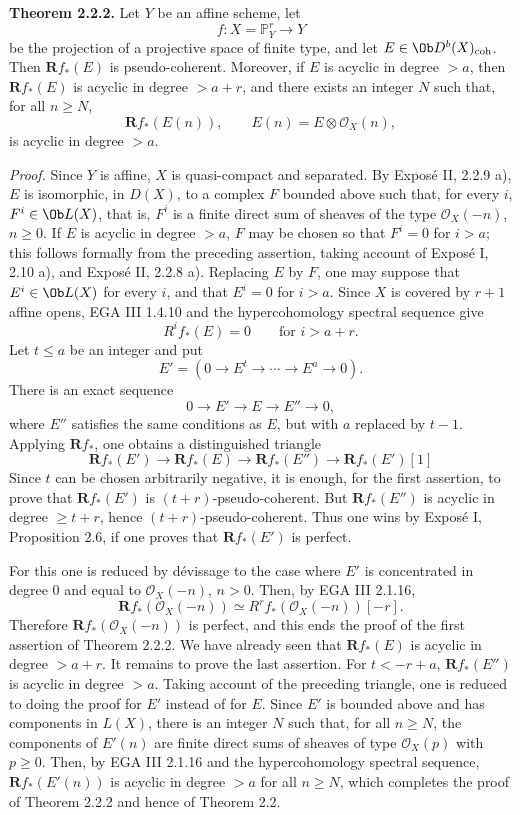 \documentclass[11pt]{article}
\begin{document}
\textbf{Theorem 2.2.2.} Let \(Y\) be an affine scheme, let
\[
  f:X=\mathbb P^r_Y\longrightarrow Y
\]
be the projection of a projective space of finite type, and let \(E\in \Ob D^b(X)_{\mathrm{coh}}\). Then \(\mathbf Rf_*(E)\) is pseudo-coherent. Moreover, if \(E\) is acyclic in degree \(>a\), then \(\mathbf Rf_*(E)\) is acyclic in degree \(>a+r\), and there exists an integer \(N\) such that, for all \(n\geq N\),
\[
  \mathbf Rf_*(E(n)),\qquad E(n)=E\otimes\mathcal O_X(n),
\]
is acyclic in degree \(>a\).

\emph{Proof.} Since \(Y\) is affine, \(X\) is quasi-compact and separated. By Exposé II, 2.2.9 a), \(E\) is isomorphic, in \(D(X)\), to a complex \(F\) bounded above such that, for every \(i\), \(F^i\in \Ob L(X)\), that is, \(F^i\) is a finite direct sum of sheaves of the type \(\mathcal O_X(-n)\), \(n\geq 0\). If \(E\) is acyclic in degree \(>a\), \(F\) may be chosen so that \(F^i=0\) for \(i>a\); this follows formally from the preceding assertion, taking account of Exposé I, 2.10 a), and Exposé II, 2.2.8 a). Replacing \(E\) by \(F\), one may suppose that \(E^i\in \Ob L(X)\) for every \(i\), and that \(E^i=0\) for \(i>a\). Since \(X\) is covered by \(r+1\) affine opens, EGA III 1.4.10 and the hypercohomology spectral sequence give
\[
  R^if_*(E)=0\qquad\text{for }i>a+r.
\]
Let \(t\leq a\) be an integer and put
\[
  E'=(0\to E^t\to\cdots\to E^a\to 0).
\]
There is an exact sequence
\[
  0\longrightarrow E'\longrightarrow E\longrightarrow E''\longrightarrow 0,
\]
where \(E''\) satisfies the same conditions as \(E\), but with \(a\) replaced by \(t-1\). Applying \(\mathbf Rf_*\), one obtains a distinguished triangle
\[
\mathbf Rf_*(E')\longrightarrow \mathbf Rf_*(E)\longrightarrow \mathbf Rf_*(E'')\longrightarrow \mathbf Rf_*(E')[1]
\]
Since \(t\) can be chosen arbitrarily negative, it is enough, for the first assertion, to prove that \(\mathbf Rf_*(E')\) is \((t+r)\)-pseudo-coherent. But \(\mathbf Rf_*(E'')\) is acyclic in degree \(\geq t+r\), hence \((t+r)\)-pseudo-coherent. Thus one wins by Exposé I, Proposition 2.6, if one proves that \(\mathbf Rf_*(E')\) is perfect.

For this one is reduced by dévissage to the case where \(E'\) is concentrated in degree \(0\) and equal to \(\mathcal O_X(-n)\), \(n>0\). Then, by EGA III 2.1.16,
\[
  \mathbf Rf_*(\mathcal O_X(-n))\simeq R^rf_*(\mathcal O_X(-n))[-r].
\]
Therefore \(\mathbf Rf_*(\mathcal O_X(-n))\) is perfect, and this ends the proof of the first assertion of Theorem 2.2.2. We have already seen that \(\mathbf Rf_*(E)\) is acyclic in degree \(>a+r\). It remains to prove the last assertion. For \(t<-r+a\), \(\mathbf Rf_*(E'')\) is acyclic in degree \(>a\). Taking account of the preceding triangle, one is reduced to doing the proof for \(E'\) instead of for \(E\). Since \(E'\) is bounded above and has components in \(L(X)\), there is an integer \(N\) such that, for all \(n\geq N\), the components of \(E'(n)\) are finite direct sums of sheaves of type \(\mathcal O_X(p)\) with \(p\geq 0\). Then, by EGA III 2.1.16 and the hypercohomology spectral sequence, \(\mathbf Rf_*(E'(n))\) is acyclic in degree \(>a\) for all \(n\geq N\), which completes the proof of Theorem 2.2.2 and hence of Theorem 2.2.
\end{document}
